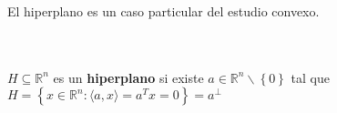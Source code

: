 El hiperplano es un caso particular del estudio convexo.

\begin{def.}[Hiperplano]\,\\\\
    $H\subseteq \mathbb{R}^n$ es un \textbf{hiperplano} si existe $a\in \mathbb{R}^n \backslash\left\{0\right\}$ tal que
    $H=\left\{x\in \mathbb{R}^n : \langle a,x\rangle = a^T x = 0\right\} = a^\perp$
\end{def.}

